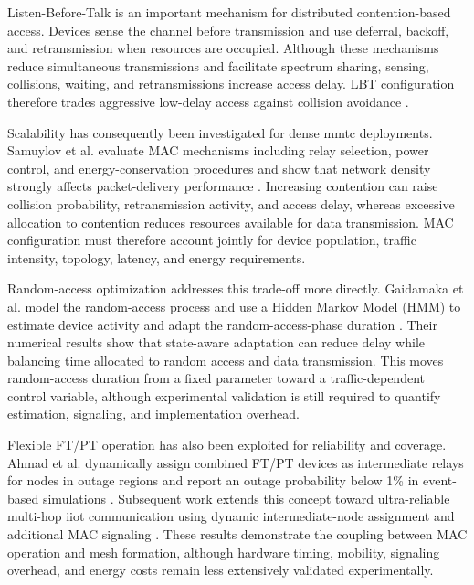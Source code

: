 Listen-Before-Talk is an important mechanism for distributed contention-based
access. Devices sense the channel before transmission and use deferral,
backoff, and retransmission when resources are occupied. Although these
mechanisms reduce simultaneous transmissions and facilitate spectrum sharing,
sensing, collisions, waiting, and retransmissions increase access delay. LBT
configuration therefore trades aggressive low-delay access against collision
avoidance
\cite{etsi_ts103636_4,
samuylovPerformanceMACLayer2024a,
glazkovImprovingNearURLLCServices2025}.

Scalability has consequently been investigated for dense \gls{mmtc}
deployments. Samuylov et al. evaluate MAC mechanisms including relay
selection, power control, and energy-conservation procedures and show that
network density strongly affects packet-delivery performance
\cite{samuylovPerformanceMACLayer2024a}. Increasing contention can raise
collision probability, retransmission activity, and access delay, whereas
excessive allocation to contention reduces resources available for data
transmission. MAC configuration must therefore account jointly for device
population, traffic intensity, topology, latency, and energy requirements.

Random-access optimization addresses this trade-off more directly. Gaidamaka
et al. model the random-access process and use a Hidden Markov Model (HMM) to
estimate device activity and adapt the random-access-phase duration
\cite{gaidamakaOptimizingDelaysRandom2025}. Their numerical results show that
state-aware adaptation can reduce delay while balancing time allocated to
random access and data transmission. This moves random-access duration from a
fixed parameter toward a traffic-dependent control variable, although
experimental validation is still required to quantify estimation, signaling,
and implementation overhead.

Flexible FT/PT operation has also been exploited for reliability and coverage.
Ahmad et al. dynamically assign combined FT/PT devices as intermediate relays
for nodes in outage regions and report an outage probability below 1\% in
event-based simulations
\cite{ahmadMACProtocolReducing2024}. Subsequent work extends this concept
toward ultra-reliable multi-hop \gls{iiot} communication using dynamic
intermediate-node assignment and additional MAC signaling
\cite{ahmadMACLayerProtocolUltraReliable2025}. These results demonstrate the
coupling between MAC operation and mesh formation, although hardware timing,
mobility, signaling overhead, and energy costs remain less extensively
validated experimentally.

